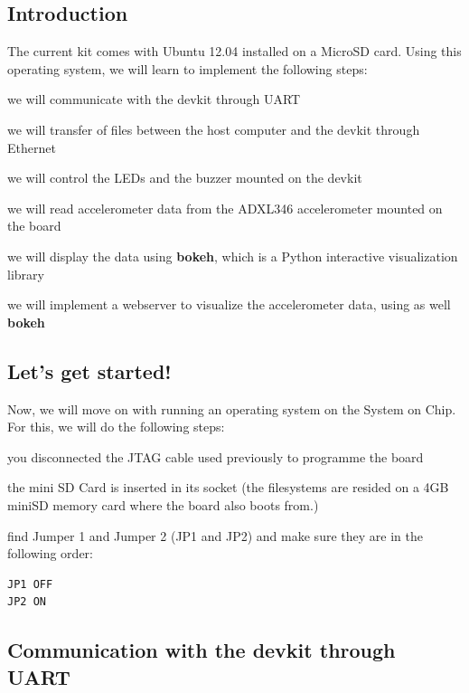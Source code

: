 \subsection{Introduction}

The current kit comes with Ubuntu 12.04 installed on a MicroSD card. Using this 
operating system, we will learn to implement the following steps:
\begin{myitemize}
\item we will communicate with the devkit through UART
\item we will transfer of files between the host computer and the devkit through Ethernet
\item we will control the LEDs and the buzzer mounted on the devkit
\item we will read accelerometer data from the ADXL346 accelerometer mounted on the board
\item we will display the data using \textbf{bokeh}, which is a Python interactive visualization library
\item we will implement a webserver to visualize the accelerometer data, using as well \textbf{bokeh}
\end{myitemize}



\subsection{Let's get started!}

Now, we will move on with running an operating system on the System on Chip. For this, we will do the following steps:
\begin{myitemize}
\item you disconnected the JTAG cable used previously to programme the board
\item the mini SD Card is inserted in its socket (the filesystems are resided on a 4GB miniSD memory card where the board also boots from.)
\item find Jumper 1 and Jumper 2 (JP1 and JP2) and make sure they are in the following order:
\begin{verbatim}
JP1 OFF 
JP2 ON
\end{verbatim}
\end{myitemize}



\subsection{Communication with the devkit through UART}

